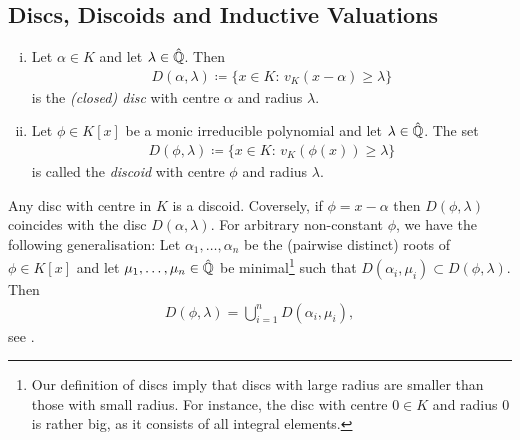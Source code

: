 \subsection{Discs, Discoids and Inductive Valuations}

\begin{definition}
    \begin{enumerate}[(i)]
        \item Let $\alpha \in K$ and let $\lambda \in \hat{\mathbb Q}$. 
            Then
                \begin{align}
                    D(\alpha, \lambda) \coloneqq \lbrace x \in K:\, v_K(x - \alpha) \geq \lambda\rbrace
                \end{align}
            is the \textit{(closed) disc} with centre $\alpha$ and radius $\lambda$.
        \item Let $\phi \in K[x]$ be a monic irreducible polynomial and let $\lambda \in \hat{\mathbb Q}$.
            The set 
            \begin{align}
                D(\phi, \lambda) \coloneqq \lbrace x \in K:\, v_K(\phi(x)) \geq \lambda \rbrace
            \end{align}
            is called the \textit{discoid} with centre $\phi$ and radius $\lambda$.
    \end{enumerate}
\end{definition}

\begin{remark}
    Any disc with centre in $K$ is a discoid.
    Coversely, if $\phi = x - \alpha$ then $D(\phi, \lambda)$ coincides with the disc $D(\alpha, \lambda)$.
    For arbitrary non-constant $\phi$, we have the following generalisation:
    Let $\alpha_1,\dots,\alpha_n$ be the (pairwise distinct) roots of $\phi \in K[x]$
    and let $\mu_1,\dots,\mu_n \in \hat{\mathbb Q}$ be minimal\footnote{
        Our definition of discs imply that discs with large radius are smaller than those with small radius.
        For instance, the disc with centre $0\in K$ and radius $0$ is rather big, as it consists of all integral elements.
    } such that $D(\alpha_i,\mu_i) \subset D(\phi,\lambda)$.
    Then
    \begin{align}
        D(\phi,\lambda) = \bigcup_{i=1}^n D(\alpha_i,\mu_i),
    \end{align}
    see \cite[Lemma 4.43]{Rueth}.
\end{remark}